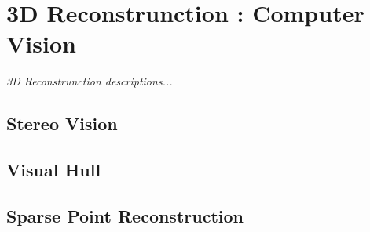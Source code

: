 \chapter{3D Reconstrunction : Computer Vision}\label{ch:3Dreconstruction}
\begin{center}
{\small\em 3D Reconstrunction descriptions...}
\end{center}

\section{Stereo Vision}

\section{Visual Hull}

\section{Sparse Point Reconstruction}

\newpage
